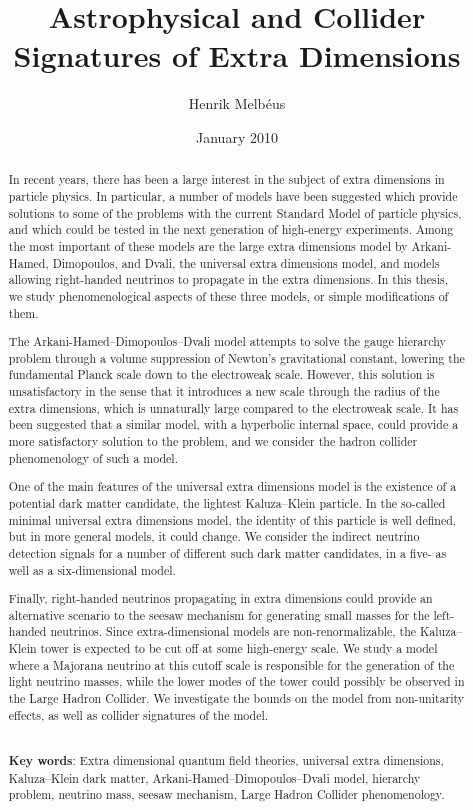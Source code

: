 \documentclass[nocoverpage,swedish,g5paper]{thesis}
\title{Astrophysical and Collider Signatures of Extra Dimensions}
\author{Henrik Melb\'eus}
\date{January 2010}
\begin{document}

\begin{abstract}
In recent years, there has been a large interest in the subject of extra dimensions in particle physics. In particular, a number of models have been suggested which provide solutions to some of the problems with the current Standard Model of particle physics, and which could be tested in the next generation of high-energy experiments. Among the most important of these models are the large extra dimensions model by Arkani-Hamed, Dimopoulos, and Dvali, the universal extra dimensions model, and models allowing right-handed neutrinos to propagate in the extra dimensions. In this thesis, we study phenomenological aspects of these three models, or simple modifications of them.

The Arkani-Hamed--Dimopoulos--Dvali model attempts to solve the gauge hierarchy problem through a volume suppression of Newton's gravitational constant, lowering the fundamental Planck scale down to the electroweak scale. However, this solution is unsatisfactory in the sense that it introduces a new scale through the radius of the extra dimensions, which is unnaturally large compared to the electroweak scale. It has been suggested that a similar model, with a hyperbolic internal space, could provide a more satisfactory solution to the problem, and we consider the hadron collider phenomenology of such a model.

One of the main features of the universal extra dimensions model is the existence of a potential dark matter candidate, the lightest Kaluza--Klein particle. In the so-called minimal universal extra dimensions model, the identity of this particle is well defined, but in more general models, it could change. We consider the indirect neutrino detection signals for a number of different such dark matter candidates, in a five- as well as a six-dimensional model.

Finally, right-handed neutrinos propagating in extra dimensions could provide an alternative scenario to the seesaw mechanism for generating small masses for the left-handed neutrinos. Since extra-dimensional models are non-renormalizable, the Kaluza--Klein tower is expected to be cut off at some high-energy scale. We study a model where a Majorana neutrino at this cutoff scale is responsible for the generation of the light neutrino masses, while the lower modes of the tower could possibly be observed in the Large Hadron Collider. We investigate the bounds on the model from non-unitarity effects, as well as collider signatures of the model.
\\\noindent \strut \\
{\bf Key words}: Extra dimensional quantum field theories, universal extra dimensions, Kaluza--Klein dark matter, Arkani-Hamed--Dimopoulos--Dvali model, hierarchy problem, neutrino mass, seesaw mechanism, Large Hadron Collider phenomenology.
\end{abstract}
\end{document}
